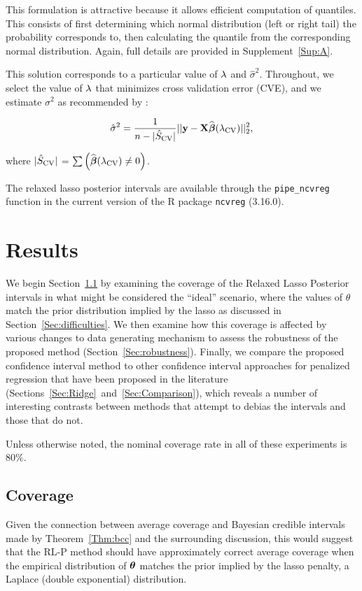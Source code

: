 This formulation is attractive because it allows efficient computation of quantiles. This consists of first determining which normal distribution (left or right tail) the probability corresponds to, then calculating the quantile from the corresponding normal distribution. Again, full details are provided in Supplement~\ref{Sup:A}.

This solution corresponds to a particular value of $\lambda$ and $\hat{\sigma}^2$. Throughout, we select the value of $\lambda$ that minimizes cross validation error (CVE), and we estimate $\sigma^2$ as recommended by \citep{Reid2016}:

$$
\hat{\sigma}^2 = \frac{1}{n - |\hat{S}_{\textrm{CV}}|} ||\mathbf{y} - \mathbf{X}\widehat{\boldsymbol{\beta}}({\lambda_{\textrm{CV}}})||_2^2,
$$

\noindent where $|\hat{S}_{\textrm{CV}}|$ = $\sum \left( \widehat{\boldsymbol{\beta}}({\lambda_{\textrm{CV}}}) \neq 0 \right)$.

The relaxed lasso posterior intervals are available through the \texttt{pipe\_ncvreg}  function in the current version of the R package \texttt{ncvreg} (3.16.0).

\section{Results}
\label{Sec:results}

We begin Section~\ref{Sec:coverage} by examining the coverage of the Relaxed Lasso Posterior intervals in what might be considered the ``ideal'' scenario, where the values of $\theta$ match the prior distribution implied by the lasso as discussed in Section~\ref{Sec:difficulties}. We then examine how this coverage is affected by various changes to data generating mechanism to assess the robustness of the proposed method (Section~\ref{Sec:robustness}). Finally, we compare the proposed confidence interval method to other confidence interval approaches for penalized regression that have been proposed in the literature (Sections~\ref{Sec:Ridge}~and~\ref{Sec:Comparison}), which reveals a number of interesting contrasts between methods that attempt to debias the intervals and those that do not.

Unless otherwise noted, the nominal coverage rate in all of these experiments is 80\%.

\subsection{Coverage}\label{Sec:coverage}

Given the connection between average coverage and Bayesian credible intervals made by Theorem~\ref{Thm:bcc} and the surrounding discussion, this would suggest that the RL-P method should have approximately correct average coverage when the empirical distribution of $\boldsymbol{\theta}$ matches the prior implied by the lasso penalty, a Laplace (double exponential) distribution.

